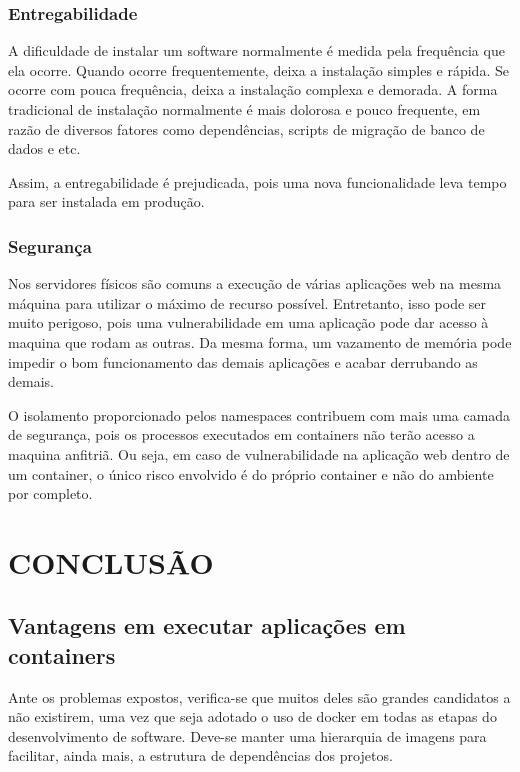 \documentclass[
	12pt,				%
	openright,			%
	oneside,			%
	a4paper,			%
	chapter=TITLE,		%
	section=TITLE,		%
	english,			%
	french,				%
	spanish,			%
	brazil				%
	]{abntex2}
\begin{document}
\subsection{Entregabilidade}

A dificuldade de instalar um software normalmente é medida pela frequência que ela ocorre. Quando ocorre frequentemente, deixa a instalação simples e rápida. Se ocorre com pouca frequência, deixa a instalação complexa e demorada. A forma tradicional de instalação normalmente é mais dolorosa e pouco frequente, em razão de diversos fatores como dependências, scripts de migração de banco de dados e etc.

Assim, a entregabilidade é prejudicada, pois uma nova funcionalidade leva tempo para ser instalada em produção.

\subsection{Segurança}

Nos servidores físicos são comuns a execução de várias aplicações web na mesma máquina para utilizar o máximo de recurso possível. Entretanto, isso pode ser muito perigoso, pois uma vulnerabilidade em uma aplicação pode dar acesso à maquina que rodam as outras. Da mesma forma, um vazamento de memória pode impedir o bom funcionamento das demais aplicações e acabar derrubando as demais.

O isolamento proporcionado pelos namespaces contribuem com mais uma camada de segurança, pois os processos executados em containers não terão acesso a maquina anfitriã. Ou seja, em caso de vulnerabilidade na aplicação web dentro de um container, o único risco envolvido é do próprio container e não do ambiente por completo.


\chapter{CONCLUSÃO}

\section{Vantagens em executar aplicações em containers}

Ante os problemas expostos, verifica-se que muitos deles são grandes candidatos a não existirem, uma vez que seja adotado o uso de docker em todas as etapas do desenvolvimento de software. Deve-se manter uma hierarquia de imagens para facilitar, ainda mais, a estrutura de dependências dos projetos.
\end{document}
